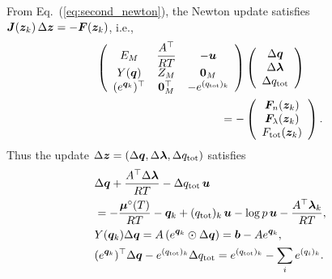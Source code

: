 From Eq.~(\ref{eq:second_newton}), the Newton update satisfies $\boldsymbol{J} (\boldsymbol{z}_k) \, \Delta \boldsymbol{z} = - \boldsymbol{F} (\boldsymbol{z}_k)$, i.e.,
\begin{align}
    \left(
\begin{array}{ccc}
 E_M &  \dfrac{A^\top}{RT} & - \boldsymbol{u}\\ 
 Y(\boldsymbol{q}) & Z_M & \boldsymbol{0}_M \\ 
 (e^{{\boldsymbol{q}}_k})^\top & \boldsymbol{0}_M^\top & - e^{(q_\mathrm{tot})_k}\\  
\end{array}
\right)
    &\left(
\begin{array}{c}
\Delta \boldsymbol{q} \\
\Delta \boldsymbol{\lambda} \\
\Delta q_\mathrm{tot}
\end{array}
\right) \nonumber \\
= -
    &\left(
\begin{array}{c}
\boldsymbol{F}_n (\boldsymbol{z}_k) \\
\boldsymbol{F}_\lambda(\boldsymbol{z}_k) \\
F_\mathrm{tot} (\boldsymbol{z}_k)
\end{array}
\right).
\end{align}
Thus the update $\Delta \boldsymbol{z} = (\Delta \boldsymbol{q}, \Delta \boldsymbol{\lambda}, \Delta q_\mathrm{tot})$ satisfies
\begin{align}
\label{eq:update_tce_1_}
    &\Delta \boldsymbol{q} + \frac{A^\top \Delta \boldsymbol{\lambda}}{RT} - \Delta q_\mathrm{tot} \, \boldsymbol{u} \nonumber \\
    &= -\frac{\boldsymbol{\mu}^\circ(T)}{RT} - {\boldsymbol{q}}_k + (q_\mathrm{tot})_k \, \boldsymbol{u} - \log{p} \, \boldsymbol{u}  - \frac{A^\top \boldsymbol{\lambda}_k}{RT}, \\
\label{eq:update_tce_2_}
    &Y(\boldsymbol{q}_k) \Delta \boldsymbol{q} = A \left(e^{\boldsymbol{q}_k} \odot \Delta \boldsymbol{q}\right) = \boldsymbol{b} - A e^{\boldsymbol{q}_k}, \\
\label{eq:update_tce_3_}
    &(e^{\boldsymbol{q}_k})^\top \Delta \boldsymbol{q}  - e^{(q_\mathrm{tot})_k} \Delta q_\mathrm{tot} = e^{(q_\mathrm{tot})_k} - \sum_i {e^{(q_i)_k}} .
\end{align}

